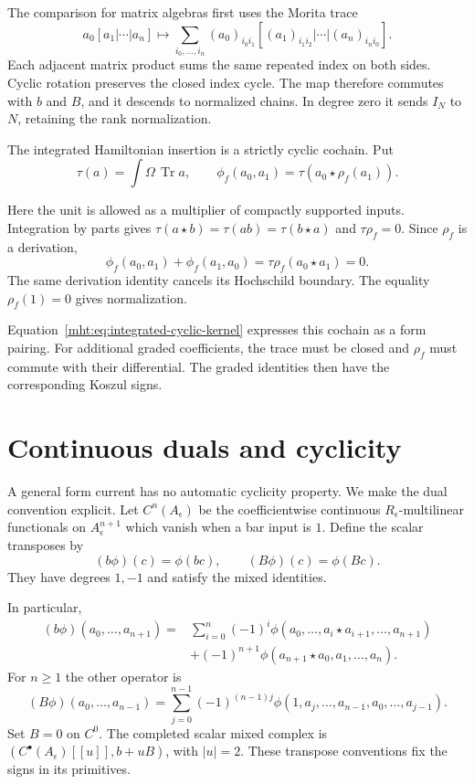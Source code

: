 The comparison for matrix algebras first uses the Morita trace
\[
 a_0[a_1|\cdots|a_n]\longmapsto
 \sum_{i_0,\ldots,i_n}
 (a_0)_{i_0i_1}[(a_1)_{i_1i_2}|\cdots|(a_n)_{i_ni_0}].
\]
Each adjacent matrix product sums the same repeated index on
both sides. Cyclic rotation preserves the closed index cycle.
The map therefore commutes with $b$ and $B$, and it descends
to normalized chains. In degree zero it sends $I_N$ to $N$,
retaining the rank normalization.

The integrated Hamiltonian insertion is a strictly cyclic
cochain. Put
\[
 \tau(a)=\int\Omega\,\operatorname{Tr}a,
 \qquad \phi_f(a_0,a_1)=\tau(a_0\star\rho_f(a_1)).
\]

Here the unit is allowed as a multiplier of compactly
supported inputs. Integration by parts gives
$\tau(a\star b)=\tau(ab)=\tau(b\star a)$ and
$\tau\rho_f=0$. Since $\rho_f$ is a derivation,
\[
 \phi_f(a_0,a_1)+\phi_f(a_1,a_0)
     =\tau\rho_f(a_0\star a_1)=0.
\]
The same derivation identity cancels its Hochschild boundary.
The equality $\rho_f(1)=0$ gives normalization.

Equation~\eqref{mht:eq:integrated-cyclic-kernel} expresses
this cochain as a form pairing. For additional graded
coefficients, the trace must be closed and $\rho_f$ must
commute with their differential. The graded identities then
have the corresponding Koszul signs.

\section{Continuous duals and cyclicity}

A general form current has no automatic cyclicity property.
We make the dual convention explicit. Let $C^n(A_\epsilon)$
be the coefficientwise continuous $R_\epsilon$-multilinear
functionals on $A_\epsilon^{n+1}$ which vanish when a bar
input is $1$. Define the scalar transposes by
\[
 (b\phi)(c)=\phi(bc),\qquad (B\phi)(c)=\phi(Bc).
\]
They have degrees $1,-1$ and satisfy the mixed identities.

In particular,
\begin{align*}
 (b\phi)(a_0,\ldots,a_{n+1})
   ={}&\sum_{i=0}^{n}(-1)^i
       \phi(a_0,\ldots,a_i\star a_{i+1},\ldots,a_{n+1})\\
    &+(-1)^{n+1}\phi(a_{n+1}\star a_0,a_1,\ldots,a_n).
\end{align*}
For $n\geq1$ the other operator is
\[
 (B\phi)(a_0,\ldots,a_{n-1})
   =\sum_{j=0}^{n-1}(-1)^{(n-1)j}
       \phi(1,a_j,\ldots,a_{n-1},a_0,\ldots,a_{j-1}).
\]
Set $B=0$ on $C^0$.
The completed scalar mixed complex is
$(C^\bullet(A_\epsilon)[[u]],b+uB)$, with $|u|=2$.
These transpose conventions fix the signs in its primitives.

